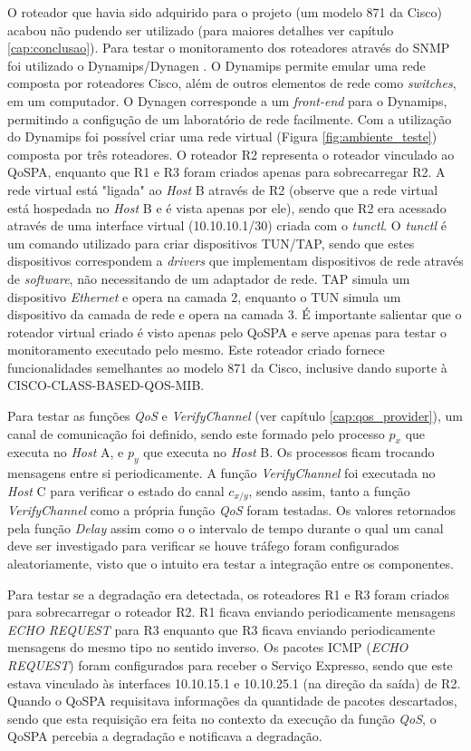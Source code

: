 	O roteador que havia sido adquirido para o projeto (um modelo 871 da Cisco) acabou não pudendo ser utilizado (para maiores detalhes ver capítulo \ref{cap:conclusao}). Para testar o monitoramento dos roteadores através do SNMP foi utilizado o Dynamips/Dynagen \cite{DYNAGEN08}. O Dynamips permite emular uma rede composta por roteadores Cisco, além de outros elementos de rede como \textit{switches}, em um computador. O Dynagen corresponde a um \textit{front-end} para o Dynamips, permitindo a configução de um laboratório de rede facilmente. Com a utilização do Dynamips foi possível criar uma rede virtual (Figura \ref{fig:ambiente_teste}) composta por três roteadores. O roteador R2 representa o roteador vinculado ao QoSPA, enquanto que R1 e R3 foram criados apenas para sobrecarregar R2. A rede virtual está "ligada" ao \textit{Host} B através de R2 (observe que a rede virtual está hospedada no \textit{Host} B e é vista apenas por ele), sendo que R2 era acessado através de uma interface virtual (10.10.10.1/30) criada com o \textit{tunctl}. O \textit{tunctl} é um comando utilizado para criar dispositivos TUN/TAP, sendo que estes dispositivos correspondem a \textit{drivers} que implementam dispositivos de rede através de \textit{software}, não necessitando de um adaptador de rede. TAP simula um dispositivo \textit{Ethernet} e opera na camada 2, enquanto o TUN simula um dispositivo da camada de rede e opera na camada 3. É importante salientar que o roteador virtual criado é visto apenas pelo QoSPA e serve apenas para testar o monitoramento executado pelo mesmo. Este roteador criado fornece funcionalidades semelhantes ao modelo 871 da Cisco, inclusive dando suporte à CISCO-CLASS-BASED-QOS-MIB.

	Para testar as funções \textit{QoS} e \textit{VerifyChannel} (ver capítulo \ref{cap:qos_provider}), um canal de comunicação foi definido, sendo este formado pelo processo $p_{x}$ que executa no \textit{Host} A, e $p_{y}$ que executa no \textit{Host} B. Os processos ficam trocando mensagens entre si periodicamente. A função \textit{VerifyChannel} foi executada no \textit{Host} C para verificar o estado do canal $c_{x/y}$, sendo assim, tanto a função \textit{VerifyChannel} como a própria função \textit{QoS} foram testadas. Os valores retornados pela função \textit{Delay} assim como o o intervalo de tempo durante o qual um canal deve ser investigado para verificar se houve tráfego foram configurados aleatoriamente, visto que o intuito era testar a integração entre os componentes.
	
	Para testar se a degradação era detectada, os roteadores R1 e R3 foram criados para sobrecarregar o roteador R2. R1 ficava enviando periodicamente mensagens \textit{ECHO REQUEST} para R3 enquanto que  R3 ficava enviando periodicamente mensagens do mesmo tipo no sentido inverso. Os pacotes ICMP (\textit{ECHO REQUEST}) foram configurados para receber o Serviço Expresso, sendo que este estava vinculado às interfaces 10.10.15.1 e 10.10.25.1 (na direção da saída) de R2. Quando o QoSPA requisitava informações da quantidade de pacotes descartados, sendo que esta requisição era feita no contexto da execução da função \textit{QoS}, o QoSPA percebia a degradação e notificava a degradação.